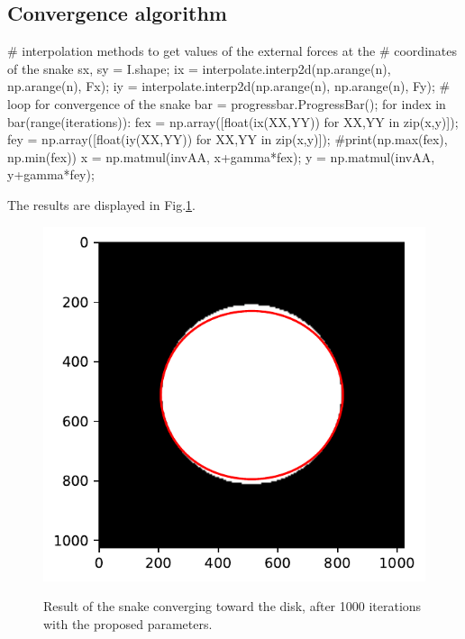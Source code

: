 \vspace*{-10pt}

\subsection{Convergence algorithm}
\begin{python}
# interpolation methods to get values of the external forces at the 
# coordinates of the snake
sx, sy = I.shape;
ix = interpolate.interp2d(np.arange(n), np.arange(n), Fx);
iy = interpolate.interp2d(np.arange(n), np.arange(n), Fy);
# loop for convergence of the snake
bar = progressbar.ProgressBar();
for index in bar(range(iterations)):
    fex = np.array([float(ix(XX,YY)) for XX,YY in zip(x,y)]);
    fey = np.array([float(iy(XX,YY)) for XX,YY in zip(x,y)]);
    #print(np.max(fex), np.min(fex))
    x = np.matmul(invAA, x+gamma*fex);
    y = np.matmul(invAA, y+gamma*fey);
\end{python}

The results are displayed in Fig.\ref{fig:active_contours:python:result}.

\begin{figure}[H]
 \centering\caption{Result of the snake converging toward the disk, after 1000 iterations with the proposed parameters.}%
 \includegraphics[width=.5\linewidth]{snake.python.pdf}%
 \label{fig:active_contours:python:result}%
\end{figure}
